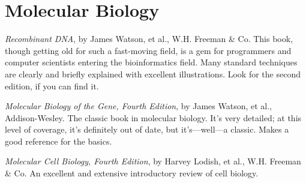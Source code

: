 \section{Molecular Biology}
\textit{Recombinant DNA}, by James Watson, et al., W.H. Freeman \& Co. This book, though getting old for such a fast-moving field, is a gem for programmers and computer scientists entering the bioinformatics field.  Many standard techniques are clearly and briefly explained with excellent illustrations. Look for the second edition, if you can find it.

\textit{Molecular Biology of the Gene, Fourth Edition}, by James Watson, et al., Addison-Wesley. The classic book in molecular biology. It's very detailed; at this level of coverage, it's definitely out of date, but it's—well—a classic. Makes a good reference for the basics.

\textit{Molecular Cell Biology, Fourth Edition}, by Harvey Lodish, et al., W.H.  Freeman \& Co. An excellent and extensive introductory review of cell biology.
